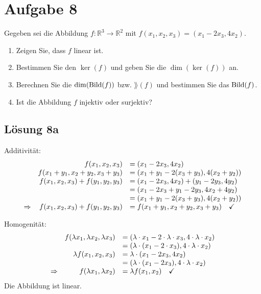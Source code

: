 \documentclass[main.tex]{subfiles}
\begin{document}
\section{Aufgabe 8}
Gegeben sei die Abbildung $f : \mathbb{R}^3 \to \mathbb{R}^2$ mit $f(x_1, x_2, x_3) = (x_1 - 2x_3, 4x_2)$.

\begin{enumerate}
    \item Zeigen Sie, dass $f$ linear ist.
    \item Bestimmen Sie den $\ker(f)$ und geben Sie die $\dim (\ker (f))$ an.
    \item Berechnen Sie die $\dim(\operatorname{Bild}(f))$ bzw. $\rang(f)$ und bestimmen Sie das $\operatorname{Bild}(f)$.
    \item Ist die Abbildung $f$ injektiv oder surjektiv?
\end{enumerate}

\subsection{Lösung 8a}
Additivität:
\begin{equation*}
    \begin{array}{ r r l }
    & f(x_1, x_2, x_3) & = (x_1 - 2x_3, 4x_2)\\
    & f(x_1 + y_1, x_2 + y_2, x_3 + y_3)  & = (x_1 + y_1 - 2(x_3 + y_3), 4(x_2 + y_2)) \\
    & f(x_1, x_2, x_3) + f(y_1, y_2, y_3) & = (x_1 - 2x_3, 4x_2) + (y_1 - 2y_3, 4y_2) \\
    & & = (x_1 - 2x_3 + y_1 - 2y_3, 4x_2 + 4y_2) \\
    & & = (x_1 + y_1 - 2(x_3 + y_3 ), 4(x_2 + y_2)) \\
    \Rightarrow  & f(x_1, x_2, x_3) + f(y_1, y_2, y_3) & = f(x_1 + y_1, x_2 + y_2, x_3 + y_3) \quad \checkmark
    \end{array}
\end{equation*}

Homogenität:
\begin{equation*}
    \begin{array}{ r r l }
    & f(\lambda x_1, \lambda x_2, \lambda x_3) & = (\lambda \cdot x_1 - 2\cdot \lambda \cdot x_3, 4 \cdot \lambda \cdot x_2)\\
    & & = (\lambda \cdot (x_1 - 2 \cdot x_3), 4 \cdot \lambda \cdot x_2)\\
    & \lambda f(x_1, x_2, x_3) & = \lambda \cdot (x_1 - 2x_3, 4x_2)\\
    & & = (\lambda \cdot (x_1 - 2x_3), 4 \cdot \lambda \cdot x_2)\\
    \Rightarrow  & f( \lambda x_{1} ,\lambda x_{2}) & =\lambda f( x_{1} ,x_{2}) \quad \checkmark
    \end{array}
\end{equation*}
Die Abbildung ist linear.
\end{document}
